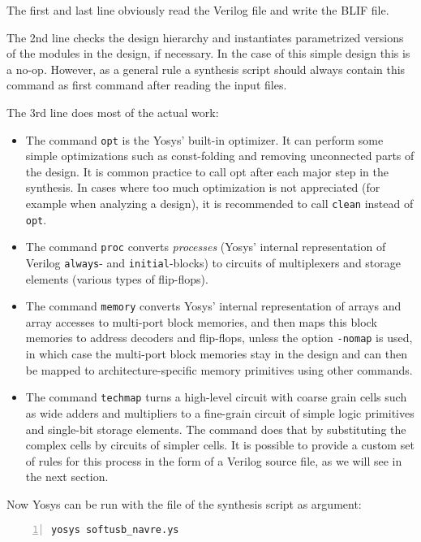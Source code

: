 The first and last line obviously read the Verilog file and write the BLIF
file. 

\medskip

The 2nd line checks the design hierarchy and instantiates parametrized 
versions of the modules in the design, if necessary. In the case of this
simple design this is a no-op. However, as a general rule a synthesis script
should always contain this command as first command after reading the input
files.

\medskip

The 3rd line does most of the actual work:

\begin{itemize}
\item The command {\tt opt} is the Yosys' built-in optimizer. It can perform
some simple optimizations such as const-folding and removing unconnected parts
of the design. It is common practice to call opt after each major step in the
synthesis. In cases where too much optimization is not appreciated (for example
when analyzing a design), it is recommended to call {\tt clean} instead of {\tt
opt}.
\item The command {\tt proc} converts {\it processes} (Yosys' internal
representation of Verilog {\tt always}- and {\tt initial}-blocks) to circuits
of multiplexers and storage elements (various types of flip-flops).
\item The command {\tt memory} converts Yosys' internal representation of 
arrays and array accesses to multi-port block memories, and then maps this
block memories to address decoders and flip-flops, unless the option {\tt -nomap}
is used, in which case the multi-port block memories stay in the design
and can then be mapped to architecture-specific memory primitives using
other commands.
\item The command {\tt techmap} turns a high-level circuit with coarse grain
cells such as wide adders and multipliers to a fine-grain circuit of simple
logic primitives and single-bit storage elements. The command does that by
substituting the complex cells by circuits of simpler cells. It is possible
to provide a custom set of rules for this process in the form of a Verilog
source file, as we will see in the next section.
\end{itemize}

Now Yosys can be run with the file of the synthesis script as argument:

\begin{lstlisting}[frame=trBL,xleftmargin=1.5em,numbers=left]
  yosys softusb_navre.ys
\end{lstlisting}

